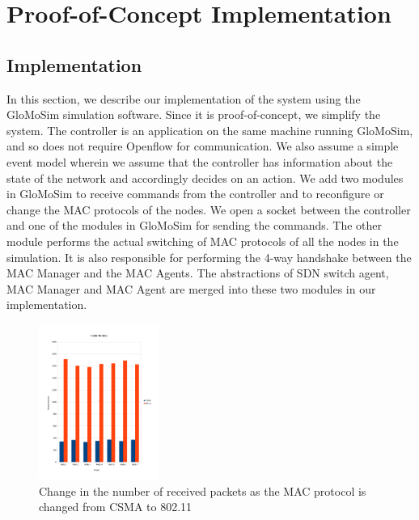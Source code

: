\section{Proof-of-Concept Implementation}
\label{sec:evaluation}

\subsection{Implementation}

In this section, we describe our implementation of the system using the GloMoSim simulation software. Since it is proof-of-concept, we simplify the system. The controller is an application on the same machine running GloMoSim, and so does not require Openflow for communication. We also assume a simple event model wherein we assume that the controller has information about the state of the network and accordingly decides on an action. We add two modules in GloMoSim to receive commands from the controller and to reconfigure or change the MAC protocols of the nodes. We open a socket between the controller and one of the modules in GloMoSim for sending the commands. The other module performs the actual switching of MAC protocols of all the nodes in the simulation. It is also responsible for performing the 4-way handshake between the MAC Manager and the MAC Agents. The abstractions of SDN switch agent, MAC Manager and MAC Agent are merged into these two modules in our implementation. 

\begin{figure}[t]
  \centering
  \includegraphics[width=0.35\textwidth, scale=0.5]{figures/hidden_recvPkts.pdf}
  \caption{Change in the number of received packets as the MAC protocol is changed from CSMA to 802.11}
  \label{fig:setup}
\end{figure}

